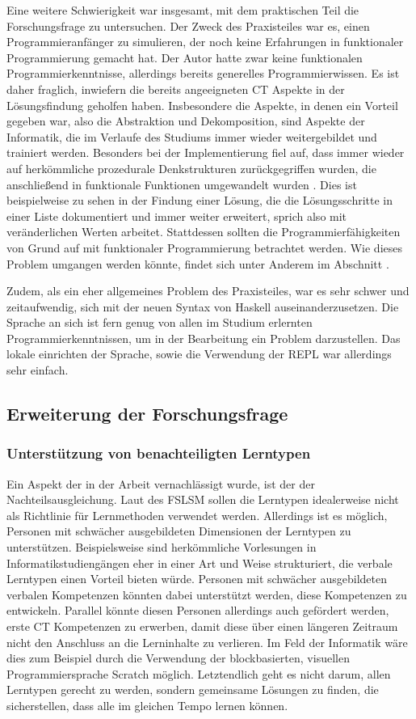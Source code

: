 Eine weitere Schwierigkeit war insgesamt, mit dem praktischen Teil die Forschungsfrage zu untersuchen. Der Zweck des Praxisteiles war es, einen Programmieranfänger zu simulieren, der noch keine Erfahrungen in funktionaler Programmierung gemacht hat. Der Autor hatte zwar keine funktionalen Programmierkenntnisse, allerdings bereits generelles Programmierwissen. Es ist daher fraglich, inwiefern die bereits angeeigneten CT Aspekte in der Lösungsfindung geholfen haben. Insbesondere die Aspekte, in denen ein Vorteil gegeben war, also die Abstraktion und Dekomposition, sind Aspekte der Informatik, die im Verlaufe des Studiums immer wieder weitergebildet und trainiert werden.
Besonders bei der Implementierung fiel auf, dass immer wieder auf herkömmliche prozedurale Denkstrukturen zurückgegriffen wurden, die anschließend in funktionale Funktionen umgewandelt wurden . Dies ist beispielweise zu sehen in der Findung einer Lösung, die die Lösungsschritte in einer Liste dokumentiert und immer weiter erweitert, sprich also mit veränderlichen Werten arbeitet.
Stattdessen sollten die Programmierfähigkeiten von Grund auf mit funktionaler Programmierung betrachtet werden. Wie dieses Problem umgangen werden könnte, findet sich unter Anderem im Abschnitt .

Zudem, als ein eher allgemeines Problem des Praxisteiles, war es sehr schwer und zeitaufwendig, sich mit der neuen Syntax von Haskell auseinanderzusetzen. Die Sprache an sich ist fern genug von allen im Studium erlernten Programmierkenntnissen, um in der Bearbeitung ein Problem darzustellen.
Das lokale einrichten der Sprache, sowie die Verwendung der REPL war allerdings sehr einfach.

\subsection{Erweiterung der Forschungsfrage}\label{sec:future}
\subsubsection{Unterstützung von benachteiligten Lerntypen}
Ein Aspekt der in der Arbeit vernachlässigt wurde, ist der der Nachteilsausgleichung. Laut des FSLSM sollen die Lerntypen idealerweise nicht als Richtlinie für Lernmethoden verwendet werden. Allerdings ist es möglich, Personen mit schwächer ausgebildeten Dimensionen der Lerntypen zu unterstützen.
Beispielsweise sind herkömmliche Vorlesungen in Informatikstudiengängen eher in einer Art und Weise strukturiert, die verbale Lerntypen einen Vorteil bieten würde. Personen mit schwächer ausgebildeten verbalen Kompetenzen könnten dabei unterstützt werden, diese Kompetenzen zu entwickeln. Parallel könnte diesen Personen allerdings auch gefördert werden, erste CT Kompetenzen zu erwerben, damit diese über einen längeren Zeitraum nicht den Anschluss an die Lerninhalte zu verlieren. Im Feld der Informatik wäre dies zum Beispiel durch die Verwendung der blockbasierten, visuellen Programmiersprache Scratch möglich.
Letztendlich geht es nicht darum, allen Lerntypen gerecht zu werden, sondern gemeinsame Lösungen zu finden, die sicherstellen, dass alle im gleichen Tempo lernen können.

